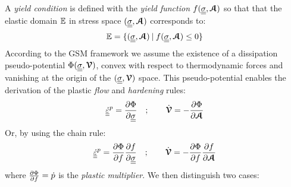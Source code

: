A \textit{yield condition} is defined with the \textit{yield function} $f({\underline{\underline{\sigma}}},{\boldsymbol{\mathcal{A}}})$ so that that the elastic domain $\mathbb{E}$ in stress space $({\underline{\underline{\sigma}}},{\boldsymbol{\mathcal{A}}})$ corresponds to:
\begin{equation}
  \label{eq:elastic_convex}
  \mathbb{E} = \{ ({\underline{\underline{\sigma}}},{\boldsymbol{\mathcal{A}}})\: | \: f({\underline{\underline{\sigma}}},{\boldsymbol{\mathcal{A}}}) \leq 0\}
\end{equation}
According to the GSM framework \cite{GSM} we assume the existence of a dissipation pseudo-potential $\Phi({\underline{\underline{\sigma}}},{\boldsymbol{\mathcal{V}}})$, convex with respect to thermodynamic forces and vanishing at the origin of the $({\underline{\underline{\sigma}}},{\boldsymbol{\mathcal{V}}})$ space. This pseudo-potential enables the derivation of the plastic \textit{flow} and \textit{hardening} rules:
\begin{equation}
  \label{eq:flow_hardening_rule}
  {\underline{\underline{\dot{\varepsilon}}}}^p=\frac{\partial \Phi}{\partial {\underline{\underline{\sigma}}}} \quad ; \quad \quad \dot{{\boldsymbol{\mathcal{V}}}} = -\frac{\partial \Phi}{\partial {\boldsymbol{\mathcal{A}}}}
\end{equation}
Or, by using the chain rule:
\begin{equation}
  \label{eq:flow_hardening_rule_plast}
  {\underline{\underline{\dot{\varepsilon}}}}^p=\frac{\partial \Phi}{\partial f}\frac{\partial f}{\partial {\underline{\underline{\sigma}}}} \quad ; \quad \quad \dot{{\boldsymbol{\mathcal{V}}}} = -\frac{\partial \Phi}{\partial f}\frac{\partial f}{\partial {\boldsymbol{\mathcal{A}}}}
\end{equation}
where $\frac{\partial \Phi}{\partial f}=\dot{p}$ is the \textit{plastic multiplier}. We then distinguish two cases:
